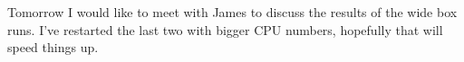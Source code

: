 \documentclass[11pt,letterpaper]{article}
\begin{document}
Tomorrow I would like to meet with James to discuss the results of the wide
box runs.  I've restarted the last two with bigger CPU numbers, hopefully
that will speed things up.
\end{document}
